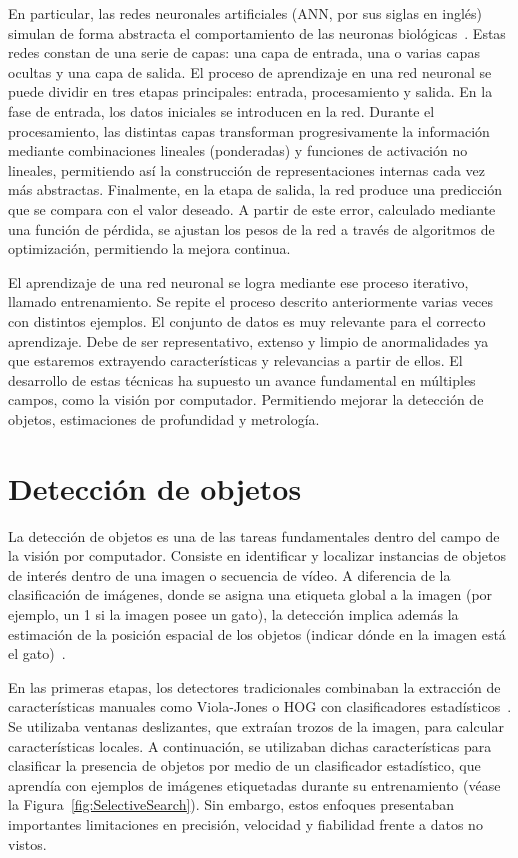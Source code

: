 En particular, las redes neuronales artificiales (ANN, por sus siglas en inglés) simulan de forma abstracta el comportamiento 
de las neuronas biológicas~\cite{ANNForPattern, ANNCambridge}. Estas redes constan de una serie de capas: una capa de entrada, 
una o varias capas ocultas y una capa de salida. El proceso de aprendizaje en una red neuronal se puede dividir en tres etapas 
principales: entrada, procesamiento y salida. En la fase de entrada, los datos iniciales se introducen en la red. 
Durante el procesamiento, las distintas capas transforman progresivamente la información mediante combinaciones lineales (ponderadas) 
y funciones de activación no lineales, permitiendo así la construcción de representaciones internas cada vez más abstractas. 
Finalmente, en la etapa de salida, la red produce una predicción que se compara con el valor deseado. 
A partir de este error, calculado mediante una función de pérdida, se ajustan los pesos de la red a través de 
algoritmos de optimización, permitiendo la mejora continua.
\par

El aprendizaje de una red neuronal se logra mediante ese proceso iterativo, llamado entrenamiento.
Se repite el proceso descrito anteriormente varias veces con distintos ejemplos. El conjunto de datos es muy relevante para el correcto 
aprendizaje. Debe de ser representativo, extenso y limpio de anormalidades ya que estaremos extrayendo características 
y relevancias a partir de ellos. El desarrollo de estas técnicas ha supuesto un avance fundamental en múltiples campos, como la 
visión por computador. Permitiendo mejorar la detección de objetos, estimaciones de profundidad y metrología.
\section{Detección de objetos}
La detección de objetos es una de las tareas fundamentales dentro del campo de la visión por computador. Consiste en identificar y localizar 
instancias de objetos de interés dentro de una imagen o secuencia de vídeo. A diferencia de la clasificación de imágenes, donde se 
asigna una etiqueta global a la imagen (por ejemplo, un 1 si la imagen posee un gato), la detección implica además la estimación de la posición
espacial de los objetos (indicar dónde en la imagen está el gato)~\cite{ObjectDetectionSurvey}.
\par
En las primeras etapas, los detectores tradicionales combinaban la extracción de características manuales como Viola-Jones o HOG con 
clasificadores estadísticos~\cite{ObjectDetectionSurvey}. Se utilizaba ventanas deslizantes, que extraían trozos de la imagen, para calcular 
características locales. A continuación, se utilizaban dichas características para clasificar la presencia de objetos por medio de un 
clasificador estadístico, que aprendía con ejemplos de imágenes etiquetadas durante su entrenamiento (véase la Figura~\ref{fig:SelectiveSearch}). 
Sin embargo, estos enfoques presentaban importantes limitaciones en precisión, velocidad y fiabilidad frente a datos no vistos.

